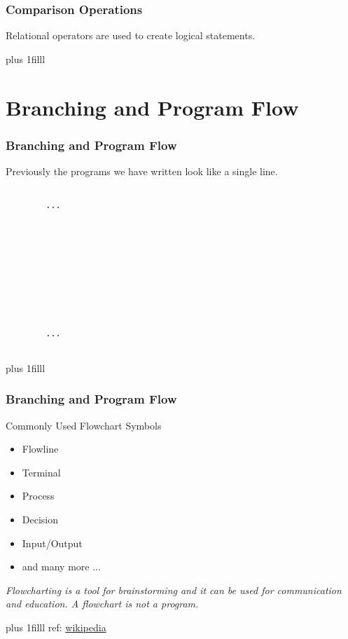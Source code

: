 \documentclass[fleqn]{beamer} %
\newcommand{\sectiontitleII}{Comparison Operations}
\newcommand{\sectiontitleIII}{Branching and Program Flow}
\newcommand{\btVFill}{\vskip0pt plus 1filll}
\begin{document}
	\begin{frame}[label=sectionII,containsverbatim] \small
	\frametitle{\sectiontitleII}
		\vspace*{5mm}
		Relational operators are used to create logical statements.

		\btVFill
	\end{frame}




\section{\sectiontitleIII}	
	\begin{frame}[label=sectionIII,containsverbatim] \small
		\frametitle{\sectiontitleIII}    
	
		Previously the programs we have written look like a single line. 
	
		\begin{lstlisting}
		
		...
		
		
		
		
		
		
		
		
		
		
		...			
		
		\end{lstlisting}
		 

		\btVFill
	\end{frame}

	\begin{frame}[label=sectionIII,containsverbatim] \small
	\frametitle{\sectiontitleIII}    
	
	Commonly Used Flowchart Symbols
	
	\begin{itemize}
		\item Flowline
		\item Terminal
		\item Process
		\item Decision
		\item Input/Output
		\item and many more ... 
		
	\end{itemize}

	{\it Flowcharting is a tool for brainstorming and it can be used for communication and education. A flowchart is not a program. }
	
	
	\btVFill
	\tiny{ref: \href{https://en.wikipedia.org/wiki/Flowchart}{wikipedia}} 
\end{frame}
\end{document}
